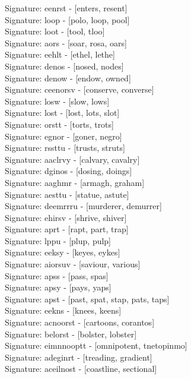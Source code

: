 Signature: {eenrst} - [enters, resent] \\
Signature: {loop} - [polo, loop, pool] \\
Signature: {loot} - [tool, tloo] \\
Signature: {aors} - [soar, rosa, oars] \\
Signature: {eehlt} - [ethel, lethe] \\
Signature: {denos} - [nosed, nodes] \\
Signature: {denow} - [endow, owned] \\
Signature: {ceenorsv} - [conserve, converse] \\
Signature: {losw} - [slow, lows] \\
Signature: {lost} - [lost, lots, slot] \\
Signature: {orstt} - [torts, trots] \\
Signature: {egnor} - [goner, negro] \\
Signature: {rssttu} - [trusts, struts] \\
Signature: {aaclrvy} - [calvary, cavalry] \\
Signature: {dginos} - [dosing, doings] \\
Signature: {aaghmr} - [armagh, graham] \\
Signature: {aesttu} - [statue, astute] \\
Signature: {deemrrru} - [murderer, demurrer] \\
Signature: {ehirsv} - [shrive, shiver] \\
Signature: {aprt} - [rapt, part, trap] \\
Signature: {lppu} - [plup, pulp] \\
Signature: {eeksy} - [keyes, eykes] \\
Signature: {aiorsuv} - [saviour, various] \\
Signature: {apss} - [pass, spas] \\
Signature: {apsy} - [pays, yaps] \\
Signature: {apst} - [past, spat, stap, pats, taps] \\
Signature: {eekns} - [knees, keens] \\
Signature: {acnoorst} - [cartoons, corantos] \\
Signature: {belorst} - [bolster, lobster] \\
Signature: {eimnnooptt} - [omnipotent, tnetopinmo] \\
Signature: {adeginrt} - [treading, gradient] \\
Signature: {aceilnost} - [coastline, sectional] \\
